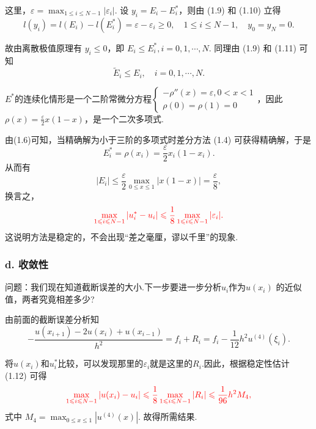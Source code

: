 这里，$\varepsilon = \max_{1\leq i\leq N-1} |\varepsilon_i|$. 设 $y_i = E_i - E_i^*$，则由 (1.9) 和 (1.10) 立得
\begin{equation*}
    l(y_i) = l(E_i) - l(E_i^*) = \varepsilon - \varepsilon_i \geq 0, \quad 1 \leq i \leq N-1, \quad y_0 = y_N = 0.
\end{equation*}\par
故由离散极值原理有 $y_i \leq 0$，即 $E_i \leq E_i^*, i=0,1,\cdots,N$. 同理由 (1.9) 和 (1.11) 可知
\begin{equation*}
    \widetilde{E}_i \leq E_i, \quad i=0,1,\cdots,N.
\end{equation*}

$E^*$的连续化情形是一个二阶常微分方程$\begin{cases}
-\rho''(x) = \varepsilon, 0 < x < 1 \\
\rho(0) = \rho(1) = 0
\end{cases}$，因此$\rho(x)=\frac{\varepsilon}{2}x(1-x)$，是一个二次多项式.\par
由(1.6)可知，当精确解为小于三阶的多项式时差分方法 (1.4) 可获得精确解，于是
\begin{equation*}
    E_i^* = \rho(x_i) = \frac{\varepsilon}{2} x_i(1 - x_i).
\end{equation*}
从而有
\begin{equation*}
    |E_i| \leq \frac{\varepsilon}{2} \max_{0 \leq x \leq 1} |x(1 - x)| = \frac{\varepsilon}{8},
\end{equation*}
换言之，
\begin{equation}
    {\color{red} \max_{1 \leq i \leq N-1} |u_i^* - u_i| \leq \frac{1}{8} \max_{1 \leq i \leq N-1} |\varepsilon_i|.}
\end{equation}
这说明方法是稳定的，不会出现“差之毫厘，谬以千里”的现象.\par

\subsubsection*{d. 收敛性}
问题：我们现在知道截断误差的大小.下一步要进一步分析$u_i$作为$u(x_i)$ 的近似值，两者究竟相差多少?\par
由前面的截断误差分析知
\begin{equation*}
    -\frac{u(x_{i+1}) - 2u(x_i) + u(x_{i-1})}{h^2} = f_i+R_i = f_i - \frac{1}{12} h^2 u^{(4)}(\xi_i).
\end{equation*}

将$u(x_i)$和$u_i^*$比较，可以发现那里的$\varepsilon_i$就是这里的$R_i$.因此，根据稳定性估计 (1.12) 可得
\begin{equation*}
    {\color{red} \max_{1 \leq i \leq N-1} |u(x_i) - u_i| \leq \frac{1}{8}\max_{1 \leq i \leq N-1} |R_i| \leq \frac{1}{96} h^2 M_4,}
\end{equation*}
式中 $M_4 = \max_{0 \leq x \leq 1} |u^{(4)}(x)|$. 故得所需结果.\par
